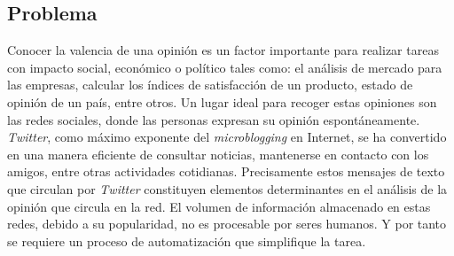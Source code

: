 \begin{introduction}
\section*{Problema}

Conocer la valencia de una opinión es un factor importante para realizar tareas
con impacto social, económico o político tales como: el análisis de
mercado para las empresas, calcular los índices de sa\-tis\-fac\-ción de un producto,
estado de opinión de un país, entre otros.
Un lugar ideal para recoger estas opiniones son las redes sociales, donde las personas 
expresan su opinión espontáneamente. 
\emph{Twitter}, como máximo exponente del \emph{microblogging} en Internet, se ha
convertido en
una manera eficiente de consultar noticias, mantenerse en contacto con los
amigos, entre otras actividades cotidianas. Precisamente estos mensajes de
texto que circulan por \emph{Twitter} constituyen elementos determinantes en el
análisis de la opinión que circula en la red.
El volumen de información almacenado en
estas redes, debido a su popularidad, no es procesable por seres humanos.
Y por tanto se requiere un proceso de automatización que simplifique la tarea. 




\end{introduction}
